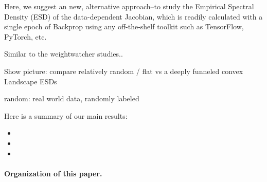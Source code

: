 Here, we suggest an new, alternative approach--to study the Empirical Spectral Density (ESD)
of the data-dependent Jacobian, which is readily calculated with a single epoch of Backprop
using any off-the-shelf toolkit such as TensorFlow, PyTorch, etc. 

Similar to the weightwatcher studies..

Show picture:  compare relatively random / flat vs  a deeply funneled convex Landscape ESDs

random:  real world data, randomly labeled 



Here is a summary of our main results:
\begin{itemize}
\item

\item

\item 

\end{itemize}


\paragraph{Organization of this paper.}



